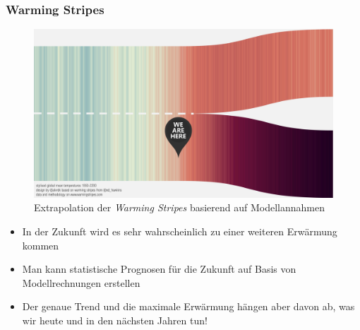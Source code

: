 \begin{frame}
	\frametitle{Warming Stripes}
	\begin{figure}
		\centering
		\includegraphics[width=0.55\linewidth]{bilder/warming_stripes_zukunft}
		\caption{Extrapolation der \textit{Warming Stripes} basierend auf Modellannahmen}
	\end{figure}
	\begin{itemize}
		\item In der Zukunft wird es sehr wahrscheinlich zu einer weiteren Erwärmung kommen
		\item Man kann statistische Prognosen für die Zukunft auf Basis von Modellrechnungen erstellen
		\item Der genaue Trend und die maximale Erwärmung hängen aber davon ab, was wir heute und in den nächsten Jahren tun!
	\end{itemize}

\end{frame}
